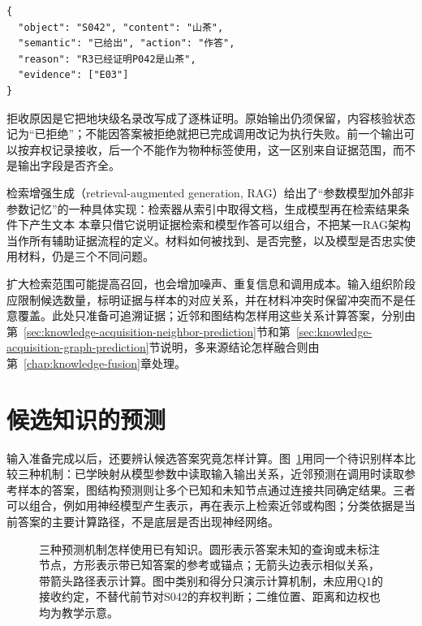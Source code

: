 \begin{lstlisting}[style=book code,numbers=none]
{
  "object": "S042", "content": "山茶",
  "semantic": "已给出", "action": "作答",
  "reason": "R3已经证明P042是山茶",
  "evidence": ["E03"]
}
\end{lstlisting}

拒收原因是它把地块级名录改写成了逐株证明。原始输出仍须保留，内容核验状态记为“已拒绝”；不能因答案被拒绝就把已完成调用改记为执行失败。前一个输出可以按弃权记录接收，后一个不能作为物种标签使用，这一区别来自证据范围，而不是输出字段是否齐全。

检索增强生成（retrieval-augmented generation, RAG）给出了“参数模型加外部非参数记忆”的一种具体实现：检索器从索引中取得文档，生成模型再在检索结果条件下产生文本
本章只借它说明证据检索和模型作答可以组合，不把某一RAG架构当作所有辅助证据流程的定义。材料如何被找到、是否完整，以及模型是否忠实使用材料，仍是三个不同问题。

扩大检索范围可能提高召回，也会增加噪声、重复信息和调用成本。输入组织阶段应限制候选数量，标明证据与样本的对应关系，并在材料冲突时保留冲突而不是任意覆盖。此处只准备可追溯证据；近邻和图结构怎样用这些关系计算答案，分别由第~\ref{sec:knowledge-acquisition-neighbor-prediction}节和第~\ref{sec:knowledge-acquisition-graph-prediction}节说明，多来源结论怎样融合则由第~\ref{chap:knowledge-fusion}章处理。

\section{候选知识的预测}
\label{sec:knowledge-acquisition-candidate-prediction}

输入准备完成以后，还要辨认候选答案究竟怎样计算。图~\ref{fig:knowledge-acquisition-prediction-mechanisms}用同一个待识别样本比较三种机制：已学映射从模型参数中读取输入输出关系，近邻预测在调用时读取参考样本的答案，图结构预测则让多个已知和未知节点通过连接共同确定结果。三者可以组合，例如用神经模型产生表示，再在表示上检索近邻或构图；分类依据是当前答案的主要计算路径，不是底层是否出现神经网络。

\begin{figure}[htbp]
  \centering
  
  \caption{三种预测机制怎样使用已有知识。圆形表示答案未知的查询或未标注节点，方形表示带已知答案的参考或锚点；无箭头边表示相似关系，带箭头路径表示计算。图中类别和得分只演示计算机制，未应用Q1的接收约定，不替代前节对S042的弃权判断；二维位置、距离和边权也均为教学示意。}
  \label{fig:knowledge-acquisition-prediction-mechanisms}
\end{figure}

